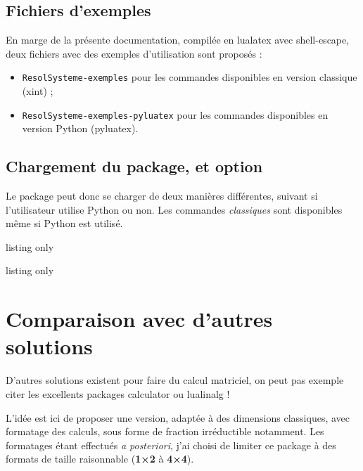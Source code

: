 \documentclass[french,a4paper,11pt]{article}
\begin{document}
\subsection{Fichiers d'exemples}

\begin{noteblock}
En marge de la présente documentation, compilée en \textsf{lualatex} avec \textsf{shell-escape}, deux fichiers avec des exemples d'utilisation sont proposés :

\begin{itemize}
	\item \texttt{ResolSysteme-exemples} pour les commandes disponibles en version classique (\textsf{xint}) ;
	\item \texttt{ResolSysteme-exemples-pyluatex} pour les commandes disponibles en version \textsf{Python} (\textsf{pyluatex}).
\end{itemize}
\vspace*{-\baselineskip}\leavevmode
\end{noteblock}

\pagebreak

\subsection{Chargement du package, et option}

\begin{importantblock}
Le package peut donc se charger de deux manières différentes, suivant si l'utilisateur utilise \textsf{Python} ou non. Les commandes \textit{classiques} sont disponibles même si \textsf{Python} est utilisé.
\end{importantblock}

\begin{PresentationCode}{listing only}
\usepackage{ResolSysteme}
\end{PresentationCode}

\begin{PresentationCode}{listing only}
\usepackage[options]{pyluatex}
\usepackage[pyluatex]{ResolSysteme}
\end{PresentationCode}

\section{Comparaison avec d'autres solutions}

\begin{noteblock}
D'autres solutions existent pour faire du calcul matriciel, on peut pas exemple citer les excellents packages \textsf{calculator} ou \textsf{lualinalg} !

\smallskip

L'idée est ici de proposer une version, adaptée à des dimensions classiques, avec formatage des calculs, sous forme de fraction irréductible notamment. Les formatages étant effectués \textit{a posteriori}, j'ai choisi de limiter ce package à des formats de taille raisonnable (\textbf{1×2} à \textbf{4×4}).
\end{noteblock}
\end{document}
